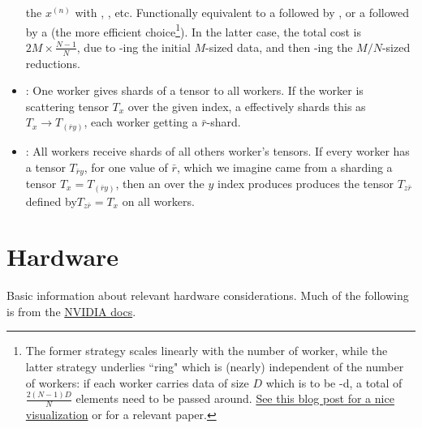 \documentclass[11pt]{article}
\begin{document}
\begin{itemize}
	      the $ x ^{ (n) } $ with , , etc. Functionally equivalent to a
	       followed by , or a  followed
	      by a  (the more efficient choice\footnote{The former strategy scales
		      linearly with the number of worker, while the latter strategy underlies ``ring"
		       which is (nearly) independent of the number of workers: if each
		      worker carries data of size $ D $ which is to be -d, a total of $
			      \frac{ 2 \left ( N-1 \right )D }{ N } $ elements need to be passed around.
		      \href{https://andrew.gibiansky.com/blog/machine-learning/baidu-allreduce/}{See this blog
			      post for a nice visualization} or \cite{bandwidthOptimalAllReduce2009} for a relevant
              paper.\label{foot_all_reduce}}). In the latter case, the total cost is $ 2M \times
              \frac{ N-1 }{ N } $, due to -ing the initial $ M $-sized data, and
              then -ing the $ M/N $-sized reductions.
      \item  {}: One worker gives shards of a tensor to all workers. If the worker
          is scattering tensor $ T _{ x } $ over the given index, a 
          effectively shards this as $ T _{ x } \longrightarrow T _{ (\bar{r}y) } $, each worker
          getting a $ \bar{r} $-shard.
      \item  {}: All workers receive shards of all others worker's tensors.  If
          every worker has a tensor $ T _{ \bar{r}y } $, for one value of $ \bar{r} $, which we
          imagine came from a sharding a tensor $ T _{ x } = T _{ (\bar{r}y) } $, then an
           over the $ y $ index produces produces the tensor $ T _{ z \bar{r} }$
          defined by$ T _{ z \bar{r} }= T _{ x } $ on all workers.
\end{itemize}



\section{Hardware}

Basic information about relevant hardware considerations. Much of the following is from the
\href{https://docs.nvidia.com/deeplearning/performance/dl-performance-gpu-background/index.html}{NVIDIA
	docs}.
\end{document}
